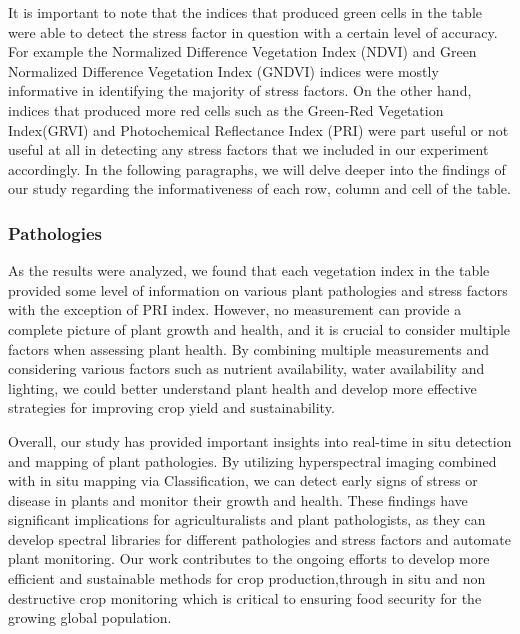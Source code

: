 \documentclass{article}
\begin{document}
                    It is important to note that the indices that produced green cells in the table were able to detect the stress factor in question with a certain level of accuracy. For example the Normalized Difference Vegetation Index (NDVI) and Green Normalized Difference Vegetation Index (GNDVI) indices were mostly informative in identifying the majority of stress factors. On the other hand, indices that produced more red cells such as the Green-Red Vegetation Index(GRVI) and Photochemical Reflectance Index (PRI) were part useful or not useful at all in detecting any stress factors that we included in our experiment accordingly. In the following paragraphs, we will delve deeper into the findings of our study regarding the informativeness of each row, column and cell of the table.\par
                    \vspace*{1\baselineskip}
                    
                    \subsubsection{Pathologies}
                    
                     As the results were analyzed, we found that each vegetation index in the table provided some level of information on various plant pathologies and stress factors with the exception of PRI index. However, no measurement can provide a complete picture of plant growth and health, and it is crucial to consider multiple factors when assessing plant health. By combining multiple measurements and considering various factors such as nutrient availability, water availability and lighting, we could better understand plant health and develop more effective strategies for improving crop yield and sustainability.\par
                    \vspace*{1\baselineskip}

                    Overall, our study has provided important insights into real-time in situ detection and mapping of plant pathologies. By utilizing hyperspectral imaging combined with in situ mapping via Classification, we can detect early signs of stress or disease in plants and monitor their growth and health. These findings have significant implications for agriculturalists and plant pathologists, as they can develop spectral libraries for different pathologies and stress factors and automate plant monitoring. Our work contributes to the ongoing efforts to develop more efficient and sustainable methods for crop production,through in situ and non destructive crop monitoring which is critical to ensuring food security for the growing global population.\par
                    \vspace*{1\baselineskip}
                    
\end{document}
